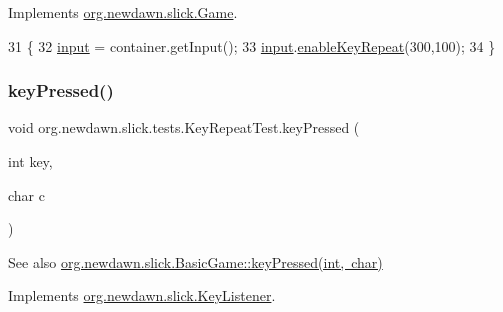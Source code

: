 Implements \mbox{\hyperlink{interfaceorg_1_1newdawn_1_1slick_1_1_game_ad2dd6affab08bb8fdb5fab0815957b7a}{org.\+newdawn.\+slick.\+Game}}.


\begin{DoxyCode}
31                                                                     \{
32         \mbox{\hyperlink{classorg_1_1newdawn_1_1slick_1_1tests_1_1_key_repeat_test_ae6cb084c8595eb389b674bce147bd4ea}{input}} = container.getInput();
33         \mbox{\hyperlink{classorg_1_1newdawn_1_1slick_1_1tests_1_1_key_repeat_test_ae6cb084c8595eb389b674bce147bd4ea}{input}}.\mbox{\hyperlink{classorg_1_1newdawn_1_1slick_1_1_input_a949805ba38338134d88e0082d10a29ed}{enableKeyRepeat}}(300,100);
34     \}
\end{DoxyCode}
\mbox{\label{classorg_1_1newdawn_1_1slick_1_1tests_1_1_key_repeat_test_ae19b26f365de8524b1e22a0f76bc8edd}} 
\subsubsection{\texorpdfstring{key\+Pressed()}{keyPressed()}}
{\footnotesize\ttfamily void org.\+newdawn.\+slick.\+tests.\+Key\+Repeat\+Test.\+key\+Pressed (\begin{DoxyParamCaption}\item[{int}]{key,  }\item[{char}]{c }\end{DoxyParamCaption})\hspace{0.3cm}{\ttfamily [inline]}}

\begin{DoxySeeAlso}{See also}
\mbox{\hyperlink{classorg_1_1newdawn_1_1slick_1_1_basic_game_a4fbb3345b5abf5ddd54a99466d07f02f}{org.\+newdawn.\+slick.\+Basic\+Game\+::key\+Pressed(int, char)}} 
\end{DoxySeeAlso}


Implements \mbox{\hyperlink{interfaceorg_1_1newdawn_1_1slick_1_1_key_listener_ac0b0568a21ef486c4f51382614c196ef}{org.\+newdawn.\+slick.\+Key\+Listener}}.


